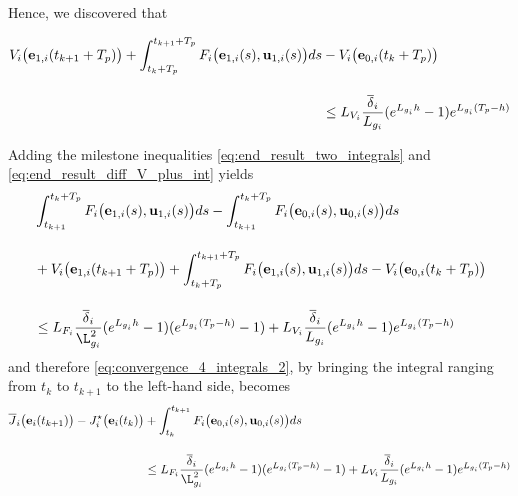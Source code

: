 Hence, we discovered that
\begin{bw_box}
\begin{align}
  V_i\big(\bm{\mathbf{e}}_{1,i}(t_{k+1} + T_p)\big)
  + \int_{t_k + T_p}^{t_{k+1} + T_p} F_i\big(\bm{\mathbf{e}}_{1,i}(s), \bm{\mathbf{u}}_{1,i}(s)\big) ds
  &- V_i\big(\bm{\mathbf{e}}_{0,i}(t_k + T_p)\big) \\[2.5ex]
  &\leq L_{V_i}\dfrac{\overline{\delta}_i}{L_{g_i}} (e^{L_{g_i}h} - 1) e^{L_{g_i} (T_p - h)}
  \label{eq:end_result_diff_V_plus_int}
\end{align}
\end{bw_box}

Adding the milestone inequalities \eqref{eq:end_result_two_integrals} and
\eqref{eq:end_result_diff_V_plus_int} yields
\begin{alignat}{2}
  &\int_{t_{k+1}}^{t_k + T_p} F_i \big(\vect{e}_{1,i}(s), \vect{u}_{1,i} (s)\big) d s
  - \int_{t_{k+1}}^{t_k + T_p} F_i \big(\vect{e}_{0,i}(s), \vect{u}_{0,i} (s)\big) d s \\[2.5ex]
  &+ V_i\big(\vect{e}_{1,i}(t_{k+1} + T_p)\big)
  + \int_{t_k + T_p}^{t_{k+1} + T_p} F_i\big(\vect{e}_{1,i}(s), \vect{u}_{1,i}(s)\big) ds
  - V_i\big(\vect{e}_{0,i}(t_k + T_p)\big) \\[2.5ex]
  &\leq L_{F_i} \dfrac{\overline{\delta}_i}{\L_{g_i}^2} (e^{L_{g_i} h} - 1) (e^{L_{g_i}(T_p-h)} - 1)
  + L_{V_i}\dfrac{\overline{\delta}_i}{L_{g_i}} (e^{L_{g_i}h} - 1) e^{L_{g_i} (T_p - h)}
\end{alignat}
and therefore \eqref{eq:convergence_4_integrals_2}, by bringing the integral
ranging from $t_k$ to $t_{k+1}$ to the left-hand side, becomes
\begin{align}
  \overline{J}_i\big(\vect{e}_i(t_{k+1})\big)
    - J_i^{\star}\big(\vect{e}_i(t_k)\big)
    &+ \int_{t_k}^{t_{k+1}} F_i \big(\vect{e}_{0,i}(s), \vect{u}_{0,i} (s)\big) d s \\[2.5ex]
    &\leq L_{F_i} \dfrac{\overline{\delta}_i}{\L_{g_i}^2} (e^{L_{g_i} h} - 1) (e^{L_{g_i}(T_p-h)} - 1)
  + L_{V_i}\dfrac{\overline{\delta}_i}{L_{g_i}} (e^{L_{g_i}h} - 1) e^{L_{g_i} (T_p - h)}
\end{align}

